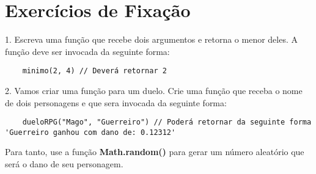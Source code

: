 \section{Exercícios de Fixação}

1. Escreva uma função que recebe dois argumentos e retorna o menor deles. A função deve ser invocada da seguinte forma: 

\begin{lstlisting}
	minimo(2, 4) // Deverá retornar 2
\end{lstlisting}

2. Vamos criar uma função para um duelo. Crie uma função que receba o nome de dois personagens e que sera invocada da seguinte forma: 

\begin{lstlisting}
	dueloRPG("Mago", "Guerreiro") // Poderá retornar da seguinte forma 'Guerreiro ganhou com dano de: 0.12312'
\end{lstlisting}

Para tanto, use a função \textbf{Math.random()} para gerar um número aleatório que será o dano de seu personagem. 

